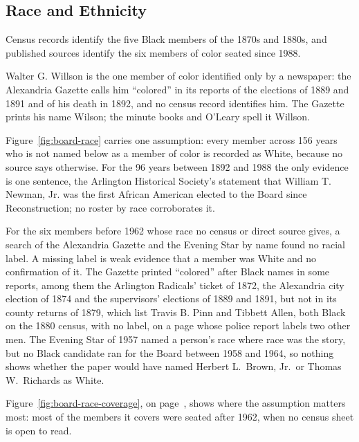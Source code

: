 \subsection{Race and Ethnicity}
Census records identify the five Black members of the 1870s and 1880s, and published
sources identify the six members of color seated since 1988.

Walter G. Willson is the one member of color identified only by a newspaper: the Alexandria
Gazette calls him ``colored'' in its reports of the elections of 1889 and 1891 and of his death in
1892, and no census record identifies him. The Gazette prints his name Wilson; the minute books and
O'Leary spell it Willson.\autocite{alexandriagazette18890525p3,alexandriagazette18910529p3,gazette1892wilsondeath}

Figure~\ref{fig:board-race} carries one assumption: every member across 156 years
who is not named below as a member of color is recorded as White, because no source
says otherwise. For the 96 years between 1892 and 1988 the only evidence is one
sentence, the Arlington Historical Society's statement that William T. Newman,
Jr. was the first African American elected to the Board since Reconstruction;
no roster by race corroborates it.

For the six members before 1962 whose race no census or direct source gives,
a search of the Alexandria Gazette and the Evening Star by name found no racial
label. A missing label is weak evidence that a member was
White and no confirmation of it. The Gazette printed ``colored'' after Black
names in some reports, among them the Arlington Radicals' ticket of 1872, the
Alexandria city election of 1874 and the supervisors' elections of 1889 and
1891, but not in its county returns of 1879, which list Travis B. Pinn and
Tibbett Allen, both Black on the 1880 census, with no label, on a page whose
police report labels two other men.\autocite{alexandriagazette18720520p3,%
alexandriagazette18740529p2,alexandriagazette18890525p3,%
alexandriagazette18910529p3,gazette1879robinson,census1880pinn,census1880allen}
The Evening Star of 1957 named a person's race where race was the story, but
no Black candidate ran for the Board between 1958 and 1964, so nothing shows
whether the paper would have named Herbert L.\ Brown, Jr.\ or Thomas W.\
Richards as White.\autocite{star1957seating}

Figure~\ref{fig:board-race-coverage}, on page~\pageref{fig:board-race-coverage},
shows where the assumption matters most: most of the members it covers were
seated after 1962, when no census sheet is open to read.

